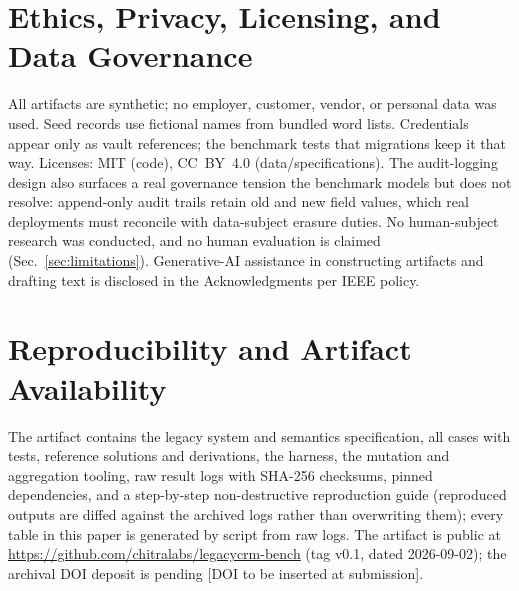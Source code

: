 \documentclass{ieeetj}
\begin{document}
\section{Ethics, Privacy, Licensing, and Data Governance}
\label{sec:ethics}
All artifacts are synthetic; no employer, customer, vendor, or personal data was used. Seed
records use fictional names from bundled word lists. Credentials appear only as vault
references; the benchmark tests that migrations keep it that way. Licenses: MIT (code),
CC~BY~4.0 (data/specifications). The audit-logging design also surfaces a real governance
tension the benchmark models but does not resolve: append-only audit trails retain old and
new field values, which real deployments must reconcile with data-subject erasure duties.
No human-subject research was conducted, and no human evaluation is claimed
(Sec.~\ref{sec:limitations}). Generative-AI assistance in constructing artifacts and drafting
text is disclosed in the Acknowledgments per IEEE policy.

\section{Reproducibility and Artifact Availability}
\label{sec:repro}
The artifact contains the legacy system and semantics specification, all cases with tests,
reference solutions and derivations, the harness, the mutation and aggregation tooling, raw
result logs with SHA-256 checksums, pinned dependencies, and a step-by-step non-destructive
reproduction guide (reproduced outputs are diffed against the archived logs rather than
overwriting them); every table in this paper is generated by script from raw logs.
The artifact is public at \url{https://github.com/chitralabs/legacycrm-bench} (tag v0.1, dated 2026-09-02); the archival DOI
deposit is pending [DOI to be inserted at submission].
\end{document}
